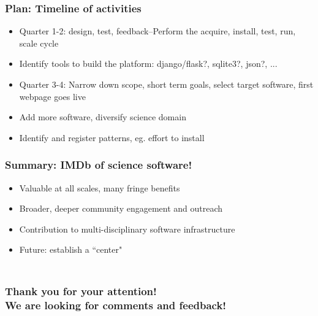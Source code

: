 \documentclass[hyperref={pdfpagelabels=false},12pt]{beamer}
\begin{document}
\begin{frame}
\frametitle{Plan: Timeline of activities }
\begin{itemize}
\itemsep1em
\item Quarter 1-2: design, test, feedback--Perform the acquire, install, test, run, scale cycle
\item Identify tools to build the platform: django/flask?, sqlite3?, json?, ...
\item Quarter 3-4: Narrow down scope, short term goals, select target software, first webpage goes live
\item Add more software, diversify science domain
\item Identify and register patterns, eg. effort to install
\end{itemize}
\end{frame}

\begin{frame}
\frametitle{Summary: IMDb of science software!}
\begin{itemize}
\itemsep1em
\item Valuable at all scales, many fringe benefits
\item Broader, deeper community engagement and outreach
\item Contribution to multi-disciplinary software infrastructure
\item Future: establish a ``center"
\end{itemize}
\end{frame}

\begin{frame}
\frametitle{\\ \centering Thank you for your attention! \\ We are looking for comments and feedback!}
\end{frame}
\end{document}
